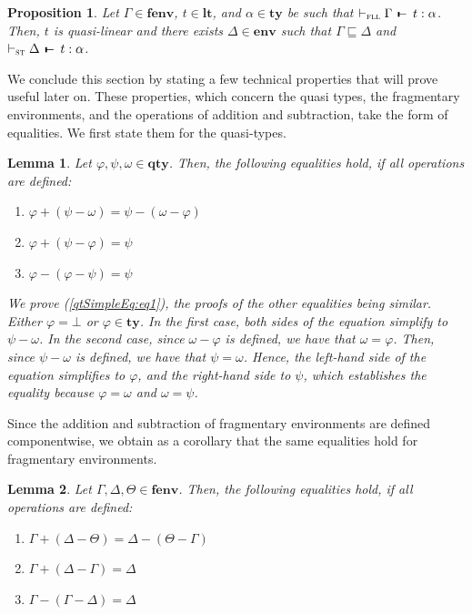 \documentclass[submission,creativecommons]{eptcs}
\newtheorem{lemma}{Lemma}
\newtheorem{proposition}{Proposition}
\newcommand{\mybox}{\raisebox{3.5pt}{\framebox[7pt]{\rule{0mm}{0.3pt}}}}
\def\qed{\ifmmode\mybox\else{\unskip\nobreak\hfil
\penalty50\hskip1em\null\nobreak\hfil\mybox
\parfillskip=0pt\finalhyphendemerits=0\endgraf}\fi}
\newenvironment{proof}{%

\vspace{.7ex}
\noindent{\it Proof.} \rm}{\qed}
\def\joinrelm{\mathrel{\mkern-3mu}}
\def\relbar{\mathrel{\smash-}}
\def\tailpiece{\mathchoice
  {\vrule height 1ex width 0.3ex depth -.1ex}%
  {\vrule height 1ex width 0.3ex depth -.1ex}%
  {\vrule height 0.7ex width 0.3ex depth -.1ex}%
  {\vrule height 0.7ex width 0.3ex depth -.1ex}}
\def\seqsym{\mathrel{\tailpiece\joinrelm\relbar}}
\newcommand{\tseq}[3]{#1 \, \seqsym \, #2 : #3}
\newcommand{\der}[1]{\vdash_{#1}}
\newcommand{\Sst}{{\textsc{st}}}
\newcommand{\Sfll}{{\textsc{fll}}}
\newcommand{\ltm}{\mathord{\mathbf{lt}}}
\newcommand{\ty}{\mathord{\mathbf{ty}}}
\newcommand{\qty}{\mathord{\mathbf{qty}}}
\newcommand{\env}{\mathord{\mathbf{env}}}
\newcommand{\fenv}{\mathord{\mathbf{fenv}}}
\begin{document}
\begin{proposition}\label{fll2fst}
Let $\Gamma\in\fenv$, $t\in\ltm$, and $\alpha\in\ty$ be such that $\der{\Sfll} \tseq{\Gamma}{t}{\alpha}$.
Then, $t$ is quasi-linear and there exists $\Delta\in\env$ such that $\Gamma\sqsubseteq\Delta$ and
$\der{\Sst} \tseq{\Delta}{t}{\alpha}$.
\end{proposition}

We conclude this section by stating a few technical properties that will prove useful later on.
These properties, which concern the quasi types, the fragmentary environments, and the operations of addition
and subtraction, take the form of equalities.
We first state them for the quasi-types.

\begin{lemma}\label{lemma:qtSimpleEq}
Let $\varphi, \psi, \omega \in \qty$. Then, the following equalities hold, if all operations are defined:
\begin{enumerate}[label={\rm (\alph*)}, ref={\rm \alph*}, labelsep*=2ex, itemsep=0pt]
  \item $\varphi + (\psi - \omega) = \psi - (\omega - \varphi)$ \label{qtSimpleEq:eq1}
  \item $\varphi + (\psi - \varphi) = \psi$ \label{qtSimpleEq:eq2}
  \item $\varphi - (\varphi - \psi) = \psi$ \label{qtSimpleEq:eq3}
\end{enumerate}
\begin{proof}
We prove (\ref{qtSimpleEq:eq1}), the proofs of the other equalities being similar.
Either $\varphi = \bot$ or $\varphi\in\ty$. In the first case, both sides of the equation simplify to
$\psi - \omega$. In the second case, since $\omega - \varphi$ is defined, we have that $\omega = \varphi$.
Then, since $\psi - \omega$ is defined, we have that $\psi = \omega$. Hence, the left-hand side of the equation
simplifies to $\varphi$, and the right-hand side to $\psi$, which establishes the equality because
$\varphi=\omega$ and $\omega=\psi$.
\end{proof}
\end{lemma}

Since the addition and subtraction of fragmentary environments are defined componentwise, we obtain as a
corollary that the same equalities hold for fragmentary environments.

\begin{lemma}\label{lemma:envSimpleEq}
Let $\Gamma, \Delta, \Theta \in \fenv$. Then, the following equalities hold, if all operations are defined:
\begin{enumerate}[label={\rm (\alph*)}, labelsep*=2ex, itemsep=0pt]
  \item $\Gamma + (\Delta - \Theta) = \Delta - (\Theta - \Gamma)$ \label{envSimpleEq:eq1}
  \item $\Gamma + (\Delta - \Gamma) = \Delta$ \label{envSimpleEq:eq2}
  \item $\Gamma - (\Gamma - \Delta) = \Delta$ \label{envSimpleEq:eq3}
\end{enumerate}
\end{lemma}
\end{document}
